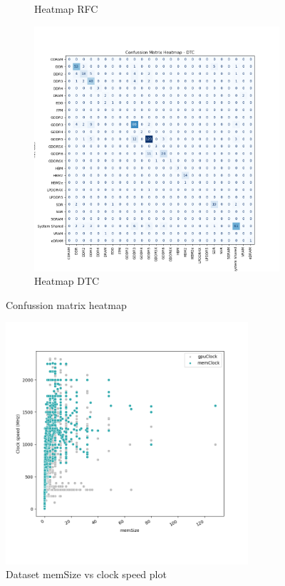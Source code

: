 \documentclass[conference]{IEEEtran}
\begin{document}
\begin{figure}[H]
\begin{subfigure}[b]{0.3\textwidth}
		\caption{Heatmap RFC}
		\label{CM_Heatmap_RFC}
	\end{subfigure}
	\hfill
	\begin{subfigure}[b]{0.3\textwidth}
		\centering
		\includegraphics[width=1.3\textwidth]{CM_Heatmap_DTC.png}
		\caption{Heatmap DTC}
		\label{CM_Heatmap_DTC}
	\end{subfigure}
	
	\caption{Confussion matrix heatmap}
	\label{Confussion matrix heatmap}
\end{figure}


\begin{figure}[H]
	\centerline{\includegraphics[width=90mm,scale=1]{DatagpuClockvsmemClock.png}}
	\caption{Dataset memSize vs clock speed plot}
	\label{DatagpuClockvsmemClock}
\end{figure}
\end{document}
